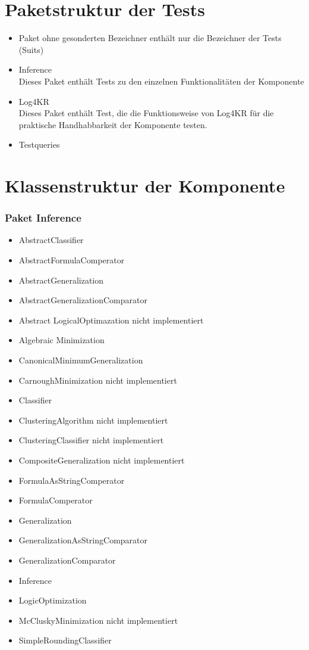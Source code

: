 \documentclass[draft]{scrreprt}
\begin{document}
{\section{Paketstruktur der Tests}
\begin{itemize}
	\item{Paket ohne gesonderten Bezeichner}
	enthält nur die Bezeichner der Tests (Suits)
	\item{Inference}\\
	Dieses Paket enthält Tests zu den einzelnen Funktionalitäten der Komponente
	\item{Log4KR}\\
	Dieses Paket enthält Test, die die Funktionsweise von Log4KR für die praktische Handhabbarkeit der Komponente testen.
	\item{Testqueries}
\end{itemize}

\section{Klassenstruktur der Komponente}
\subsubsection{Paket Inference}
\begin{itemize}
	\item AbstractClassifier
	\item AbstractFormulaComperator
	\item AbstractGeneralization
	\item AbstractGeneralizationComparator
	\item Abstract LogicalOptimazation nicht implementiert
	\item Algebraic Minimization
	\item CanonicalMinimumGeneralization
	\item CarnoughMinimization nicht implementiert
	\item Classifier
	\item ClusteringAlgorithm nicht implementiert
	\item ClusteringClassifier nicht implementiert
	\item CompositeGeneralization nicht implementiert
	\item FormulaAsStringComperator
	\item FormulaComperator
	\item Generalization
	\item GeneralizationAsStringComparator
	\item GeneralizationComparator
	\item Inference
	\item LogicOptimization
	\item McCluskyMinimization nicht implementiert
	\item SimpleRoundingClassifier
\end{itemize}
}
\end{document}
